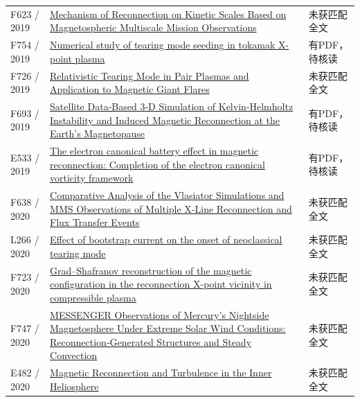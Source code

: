 \documentclass[UTF8,a4paper,11pt,openany,fontset=fandol]{ctexbook}
\begin{document}
\begin{longtable}{P{24mm}P{97mm}P{27mm}}
F623 / 2019 & \href{https://doi.org/10.3847/2041-8213/ab4b5a}{Mechanism of Reconnection on Kinetic Scales Based on Magnetospheric Multiscale Mission Observations} & 未获匹配全文\\

F754 / 2019 & \href{https://doi.org/10.1063/1.5086402}{Numerical study of tearing mode seeding in tokamak X-point plasma} & 有PDF，待核读\\

F726 / 2019 & \href{https://doi.org/10.3847/1538-4357/ab29f6}{Relativistic Tearing Mode in Pair Plasmas and Application to Magnetic Giant Flares} & 未获匹配全文\\

F693 / 2019 & \href{https://doi.org/10.1029/2019gl083282}{Satellite Data‐Based 3‐D Simulation of Kelvin‐Helmholtz Instability and Induced Magnetic Reconnection at the Earth's Magnetopause} & 有PDF，待核读\\

E533 / 2019 & \href{https://doi.org/10.1063/1.5122225}{The electron canonical battery effect in magnetic reconnection: Completion of the electron canonical vorticity framework} & 有PDF，待核读\\

F638 / 2020 & \href{https://doi.org/10.1029/2019ja027410}{Comparative Analysis of the Vlasiator Simulations and MMS Observations of Multiple X‐Line Reconnection and Flux Transfer Events} & 未获匹配全文\\

L266 / 2020 & \href{https://doi.org/10.1088/1741-4326/ab9564}{Effect of bootstrap current on the onset of neoclassical tearing mode} & 未获匹配全文\\

F723 / 2020 & \href{https://doi.org/10.1063/5.0015240}{Grad–Shafranov reconstruction of the magnetic configuration in the reconnection X-point vicinity in compressible plasma} & 未获匹配全文\\

F747 / 2020 & \href{https://doi.org/10.1029/2019ja027490}{MESSENGER Observations of Mercury's Nightside Magnetosphere Under Extreme Solar Wind Conditions: Reconnection‐Generated Structures and Steady Convection} & 未获匹配全文\\

E482 / 2020 & \href{https://escholarship.org/uc/item/0nv873w9}{Magnetic Reconnection and Turbulence in the Inner Heliosphere} & 未获匹配全文\\


\end{longtable}
\end{document}
